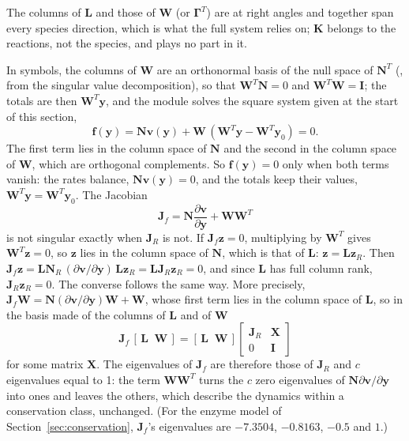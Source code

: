 \documentclass[11pt,a4paper,openany]{report}
\begin{document}
{{\noindent The columns of $\mathbf{L}$ and those of $\mathbf{W}$ (or
$\mathbf{\Gamma}^T$) are at right angles and together span every species
direction, which is what the full system relies on; $\mathbf{K}$
belongs to the reactions, not the species, and plays no part in it.

In symbols, the columns of $\mathbf{W}$ are an orthonormal basis of the null space of $\mathbf{N}^T$
(, from the singular value decomposition), so that
$\mathbf{W}^T \mathbf{N} = 0$ and $\mathbf{W}^T \mathbf{W} = \mathbf{I}$; the totals are then $\mathbf{W}^T \mathbf{y}$, and the module
solves the square system given at the start of this section,
\[
  \mathbf{f}(\mathbf{y}) = \mathbf{N} \mathbf{v}(\mathbf{y}) + \mathbf{W} \,(\mathbf{W}^T \mathbf{y} - \mathbf{W}^T \mathbf{y}_0) = 0 .
\]
The first term lies in the column space of $\mathbf{N}$ and the second in the
column space of $\mathbf{W}$, which are orthogonal complements. So $\mathbf{f}(\mathbf{y}) = 0$ only
when both terms vanish: the rates balance, $\mathbf{N} \mathbf{v}(\mathbf{y}) = 0$, and the totals
keep their values, $\mathbf{W}^T \mathbf{y} = \mathbf{W}^T \mathbf{y}_0$. The Jacobian
\[
  \mathbf{J}_f = \mathbf{N} \frac{\partial \mathbf{v}}{\partial \mathbf{y}} + \mathbf{W} \mathbf{W}^T
\]
is not singular exactly when $\mathbf{J}_R$ is not. If $\mathbf{J}_f \mathbf{z} = 0$, multiplying by
$\mathbf{W}^T$ gives $\mathbf{W}^T \mathbf{z} = 0$, so $\mathbf{z}$ lies in the column space of $\mathbf{N}$, which is
that of $\mathbf{L}$: $\mathbf{z} = \mathbf{L} \mathbf{z}_R$. Then $\mathbf{J}_f \mathbf{z} = \mathbf{L} \mathbf{N}_R \,(\partial \mathbf{v} / \partial \mathbf{y})\,
\mathbf{L} \mathbf{z}_R = \mathbf{L} \mathbf{J}_R \mathbf{z}_R = 0$, and since $\mathbf{L}$ has full column rank, $\mathbf{J}_R \mathbf{z}_R = 0$.
The converse follows the same way. More precisely, $\mathbf{J}_f \mathbf{W} = \mathbf{N}
(\partial \mathbf{v} / \partial \mathbf{y}) \mathbf{W} + \mathbf{W}$, whose first term lies in the column space
of $\mathbf{L}$, so in the basis made of the columns of $\mathbf{L}$ and of $\mathbf{W}$
\[
  \mathbf{J}_f \,[\,\mathbf{L} \;\; \mathbf{W}\,] = [\,\mathbf{L} \;\; \mathbf{W}\,]
  \begin{bmatrix} \mathbf{J}_R & \mathbf{X} \\ 0 & \mathbf{I} \end{bmatrix}
\]
for some matrix $\mathbf{X}$. The eigenvalues of $\mathbf{J}_f$ are therefore those of $\mathbf{J}_R$
and $c$ eigenvalues equal to 1: the term $\mathbf{W} \mathbf{W}^T$ turns the $c$ zero
eigenvalues of $\mathbf{N} \partial \mathbf{v} / \partial \mathbf{y}$ into ones and leaves the others,
which describe the dynamics within a conservation class, unchanged. (For
the enzyme model of Section~\ref{sec:conservation}, $\mathbf{J}_f$'s eigenvalues are $-7.3504$, $-0.8163$,
$-0.5$ and $1$.)

}}
\end{document}
